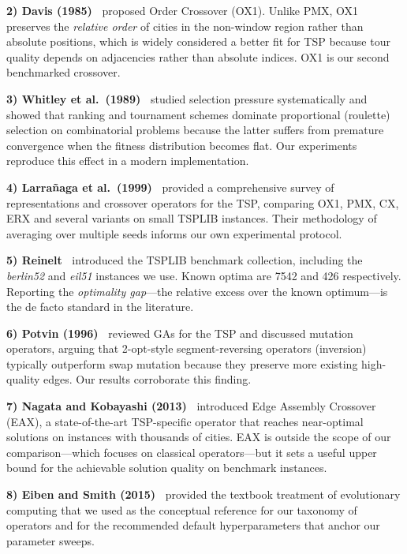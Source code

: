 \documentclass[conference]{IEEEtran}
\begin{document}
\textbf{2) Davis (1985)~\cite{davis1985}} proposed Order Crossover (OX1).
Unlike PMX, OX1 preserves the \emph{relative order} of cities in the
non-window region rather than absolute positions, which is widely
considered a better fit for TSP because tour quality depends on adjacencies
rather than absolute indices. OX1 is our second benchmarked crossover.

\textbf{3) Whitley et al.\ (1989)~\cite{whitley1989}} studied selection
pressure systematically and showed that ranking and tournament schemes
dominate proportional (roulette) selection on combinatorial problems
because the latter suffers from premature convergence when the fitness
distribution becomes flat. Our experiments reproduce this effect in a
modern implementation.

\textbf{4) Larrañaga et al.\ (1999)~\cite{larranaga1999}} provided a
comprehensive survey of representations and crossover operators for the
TSP, comparing OX1, PMX, CX, ERX and several variants on small TSPLIB
instances. Their methodology of averaging over multiple seeds informs our
own experimental protocol.

\textbf{5) Reinelt~\cite{reinelt1991}} introduced the TSPLIB benchmark
collection, including the \textit{berlin52} and \textit{eil51} instances we
use. Known optima are 7542 and 426 respectively. Reporting the
\emph{optimality gap}---the relative excess over the known optimum---is the
de facto standard in the literature.

\textbf{6) Potvin (1996)~\cite{potvin1996}} reviewed GAs for the TSP and
discussed mutation operators, arguing that 2-opt-style segment-reversing
operators (inversion) typically outperform swap mutation because they
preserve more existing high-quality edges. Our results corroborate this
finding.

\textbf{7) Nagata and Kobayashi (2013)~\cite{nagata2013}} introduced Edge
Assembly Crossover (EAX), a state-of-the-art TSP-specific operator that
reaches near-optimal solutions on instances with thousands of cities. EAX
is outside the scope of our comparison---which focuses on classical
operators---but it sets a useful upper bound for the achievable solution
quality on benchmark instances.

\textbf{8) Eiben and Smith (2015)~\cite{eiben2015}} provided the textbook
treatment of evolutionary computing that we used as the conceptual
reference for our taxonomy of operators and for the recommended default
hyperparameters that anchor our parameter sweeps.
\end{document}
